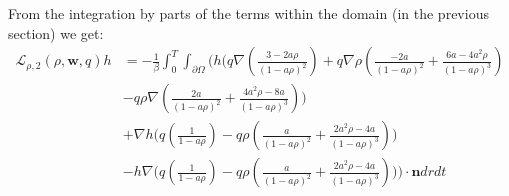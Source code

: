 \documentclass[11pt, a4paper]{article}
\theoremstyle{definition}
\newcommand{\w}{\mathbf{w}}
\newcommand{\n}{\mathbf{n}}
\begin{document}
From the integration by parts of the terms within the domain (in the previous section) we get:
\begin{align*}
	\mathcal{L}_{\rho,2}(\rho, \w,q)h &= - \frac{1}{\beta}\int_0^T \int_{\partial \Omega} \bigg(h \bigg( q  \nabla \left( \frac{3-2a\rho}{(1-a\rho)^2} \right) + q \nabla \rho  \left( \frac{-2a }{(1-a\rho)^2} + \frac{6a-4a^2  \rho}{(1-a\rho)^3}  \right)\\
	&- q\rho \nabla \left(\frac{2a }{(1-a\rho)^2} + \frac{4a^2\rho -8a}{(1-a\rho)^3} \right) \bigg)\\
	& + \nabla h \bigg(q \left(\frac{1}{1- a\rho} \right)  - q\rho  \left(\frac{a }{(1-a\rho)^2} + \frac{2a^2\rho -4a}{(1-a\rho)^3} \right)  \bigg) \\
	&- h \nabla \bigg(q \left(\frac{1}{1- a\rho} \right)  - q\rho  \left(\frac{a }{(1-a\rho)^2} + \frac{2a^2\rho -4a}{(1-a\rho)^3} \right)  \bigg) \bigg)\cdot \n dr dt
\end{align*}
\end{document}
